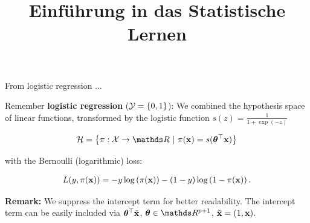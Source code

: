 \documentclass[11pt,compress,t,notes=noshow, xcolor=table]{beamer}
\title{Einführung in das Statistische Lernen}
\institute{\href{https://compstat-lmu.github.io/lecture_i2ml/}{compstat-lmu.github.io/lecture\_i2ml}}
\date{}
\begin{document}












\begin{vbframe}{From logistic regression ...}

    Remember \textbf{logistic regression} ($\mathcal{Y} = \{0, 1\}$): We combined the hypothesis space of linear functions, transformed by the logistic function $s(z) = \frac{1}{1 + \exp(- z)}$

    \vspace*{-0.3cm}

    \begin{eqnarray*}
      \Hspace = \left\{\pi: \Xspace \to \R ~|~\pix = s(\thetab^\top \xv)\right\}
    \end{eqnarray*}

    with the Bernoulli (logarithmic) loss:

    \begin{eqnarray*}
      L(y, \pi(\mathbf{x})) = -y \log \left(\pi(\mathbf{x})\right) - (1 - y) \log \left(1 - \pi(\mathbf{x})\right).
    \end{eqnarray*}

    \vfill

    \begin{footnotesize}
      \textbf{Remark:} We suppress the intercept term for better readability. The intercept term can be easily included via $\bm{\theta}^\top \tilde{\mathbf{x}}$, $\thetab \in \R^{p + 1}$, $\tilde{\mathbf{x}} = (1, \mathbf{x})$.
    \end{footnotesize}

    \end{vbframe}
\end{document}
